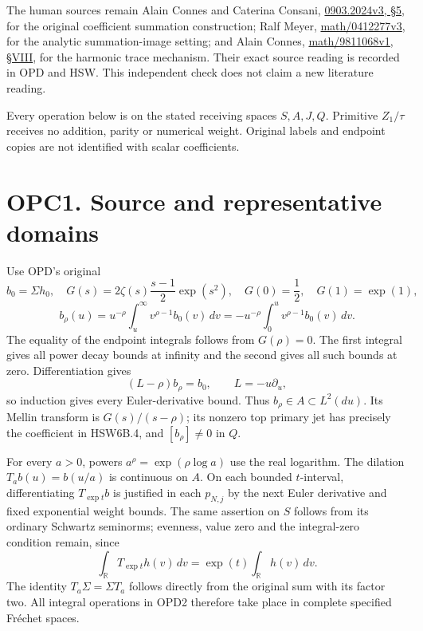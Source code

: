 The human sources remain Alain Connes and Caterina Consani,
\href{https://arxiv.org/abs/0903.2024v3}{0903.2024v3, §5}, for the
original coefficient summation construction; Ralf Meyer,
\href{https://arxiv.org/abs/math/0412277v3}{math/0412277v3}, for the
analytic summation-image setting; and Alain Connes,
\href{https://arxiv.org/abs/math/9811068v1}{math/9811068v1, §VIII}, for
the harmonic trace mechanism. Their exact source reading is recorded in
OPD and HSW. This independent check does not claim a new literature
reading.

Every operation below is on the stated receiving spaces \(S,A,J,Q\).
Primitive \(Z_1/\tau\) receives no addition, parity or numerical weight.
Original labels and endpoint copies are not identified with scalar
coefficients.

\section{OPC1. Source and representative
domains}\label{opc1.-source-and-representative-domains}

Use OPD's original \[
b_0=\Sigma h_0,\quad
G(s)=2\zeta(s)\frac{s-1}{2}\exp(s^2),\quad
G(0)=\frac12,\quad G(1)=\exp(1),
\] \[
b_\rho(u)=u^{-\rho}\int_u^\infty v^{\rho-1}b_0(v)\,dv
=-u^{-\rho}\int_0^u v^{\rho-1}b_0(v)\,dv.
\tag{OPC1.1}
\] The equality of the endpoint integrals follows from \(G(\rho)=0\).
The first integral gives all power decay bounds at infinity and the
second gives all such bounds at zero. Differentiation gives \[
(L-\rho)b_\rho=b_0,\qquad L=-u\partial_u,
\] so induction gives every Euler-derivative bound. Thus
\(b_\rho\in A\subset L^2(du)\). Its Mellin transform is
\(G(s)/(s-\rho)\); its nonzero top primary jet has precisely the
coefficient in HSW6B.4, and \([b_\rho]\ne0\) in \(Q\).

For every \(a>0\), powers \(a^\rho=\exp(\rho\log a)\) use the real
logarithm. The dilation \(T_ab(u)=b(u/a)\) is continuous on \(A\). On
each bounded \(t\)-interval, differentiating \(T_{\exp t}b\) is
justified in each \(p_{N,j}\) by the next Euler derivative and fixed
exponential weight bounds. The same assertion on \(S\) follows from its
ordinary Schwartz seminorms; evenness, value zero and the integral-zero
condition remain, since \[
\int_{\mathbb{R}} T_{\exp t}h(v)\,dv=\exp(t)\int_{\mathbb{R}} h(v)\,dv.
\] The identity \(T_a\Sigma=\Sigma T_a\) follows directly from the
original sum with its factor two. All integral operations in OPD2
therefore take place in complete specified Fréchet spaces.

